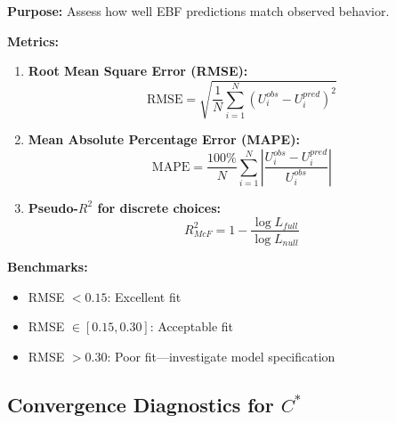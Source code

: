 \begin{tcolorbox}[colback=gray!5!white, colframe=gray!75!black,
    title=Diagnostic Protocol AZ-V1: Model Fit Assessment]
\textbf{Purpose:} Assess how well EBF predictions match observed behavior.

\textbf{Metrics:}
\begin{enumerate}[nosep]
\item \textbf{Root Mean Square Error (RMSE):}
\begin{equation}
\text{RMSE} = \sqrt{\frac{1}{N}\sum_{i=1}^N (U^{obs}_i - U^{pred}_i)^2}
\end{equation}

\item \textbf{Mean Absolute Percentage Error (MAPE):}
\begin{equation}
\text{MAPE} = \frac{100\%}{N}\sum_{i=1}^N \left|\frac{U^{obs}_i - U^{pred}_i}{U^{obs}_i}\right|
\end{equation}

\item \textbf{Pseudo-$R^2$ for discrete choices:}
\begin{equation}
R^2_{McF} = 1 - \frac{\log L_{full}}{\log L_{null}}
\end{equation}
\end{enumerate}

\textbf{Benchmarks:}
\begin{itemize}[nosep]
\item RMSE $< 0.15$: Excellent fit
\item RMSE $\in [0.15, 0.30]$: Acceptable fit
\item RMSE $> 0.30$: Poor fit---investigate model specification
\end{itemize}
\end{tcolorbox}

\subsection{Convergence Diagnostics for $C^*$}

